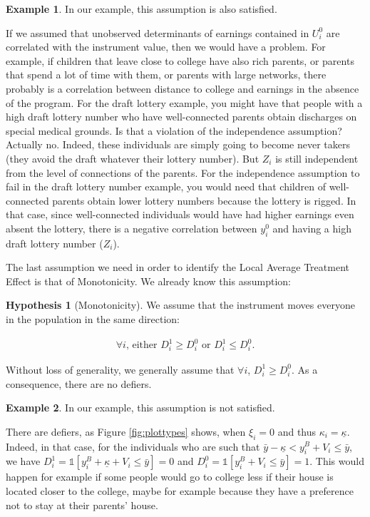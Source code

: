 \documentclass[
]{book}
\newcommand{\uns}[1]{\mathds{1}[ #1 ]}
\theoremstyle{definition}
\theoremstyle{definition}
\newtheorem{example}{Example}[chapter]
\theoremstyle{definition}
\theoremstyle{definition}
\newtheorem{hypothesis}{Hypothesis}[chapter]
\theoremstyle{remark}
\begin{document}
\begin{example}
\protect\hypertarget{exm:unnamed-chunk-143}{}{\label{exm:unnamed-chunk-143} }In our example, this assumption is also satisfied.
\end{example}
If we assumed that unobserved determinants of earnings contained in \(U^0_i\) are correlated with the instrument value, then we would have a problem.
For example, if children that leave close to college have also rich parents, or parents that spend a lot of time with them, or parents with large networks, there probably is a correlation between distance to college and earnings in the absence of the program.
For the draft lottery example, you might have that people with a high draft lottery number who have well-connected parents obtain discharges on special medical grounds.
Is that a violation of the independence assumption?
Actually no.
Indeed, these individuals are simply going to become never takers (they avoid the draft whatever their lottery number).
But \(Z_i\) is still independent from the level of connections of the parents.
For the independence assumption to fail in the draft lottery number example, you would need that children of well-connected parents obtain lower lottery numbers because the lottery is rigged.
In that case, since well-connected individuals would have had higher earnings even absent the lottery, there is a negative correlation between \(y_i^0\) and having a high draft lottery number (\(Z_i\)).

The last assumption we need in order to identify the Local Average Treatment Effect is that of Monotonicity.
We already know this assumption:

\begin{hypothesis}[Monotonicity]
\protect\hypertarget{hyp:Monotonicity}{}{\label{hyp:Monotonicity} \iffalse (Monotonicity) \fi{} }We assume that the instrument moves everyone in the population in the same direction:

\begin{align*}
\forall i\text{, either } D^1_i\geq D_i^0 \text{ or } D^1_i\leq D_i^0.
\end{align*}
\end{hypothesis}

Without loss of generality, we generally assume that \(\forall i\), \(D^1_i\geq D_i^0\).
As a consequence, there are no defiers.

\begin{example}
\protect\hypertarget{exm:unnamed-chunk-144}{}{\label{exm:unnamed-chunk-144} }In our example, this assumption is not satisfied.
\end{example}
There are defiers, as Figure \ref{fig:plottypes} shows, when \(\xi_i = 0\) and thus \(\kappa_i=\underline{\kappa}\).
Indeed, in that case, for the individuals who are such that \(\bar{y}-\underline{\kappa}<y_i^B+V_i\leq\bar{y}\), we have \(D^1_i=\uns{y_i^B+\underline{\kappa} + V_i\leq\bar{y}}=0\) and \(D^0_i=\uns{y_i^B + V_i\leq\bar{y}}=1\).
This would happen for example if some people would go to college less if their house is located closer to the college, maybe for example because they have a preference not to stay at their parents' house.
\end{document}
